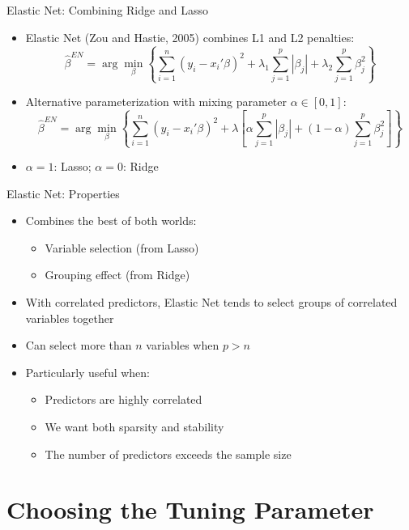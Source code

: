 \documentclass[aspectratio=169]{beamer}
\begin{document}
\begin{frame}{Elastic Net: Combining Ridge and Lasso}
\begin{itemize}
    \item Elastic Net (Zou and Hastie, 2005) combines L1 and L2 penalties:
    \[\hat{\beta}^{EN} = \arg\min_{\beta} \left\{ \sum_{i=1}^{n}(y_i - x_i'\beta)^2 + \lambda_1 \sum_{j=1}^{p}|\beta_j| + \lambda_2 \sum_{j=1}^{p}\beta_j^2 \right\}\]
    \item Alternative parameterization with mixing parameter $\alpha \in [0,1]$:
    \[\hat{\beta}^{EN} = \arg\min_{\beta} \left\{ \sum_{i=1}^{n}(y_i - x_i'\beta)^2 + \lambda \left[ \alpha \sum_{j=1}^{p}|\beta_j| + (1-\alpha) \sum_{j=1}^{p}\beta_j^2 \right] \right\}\]
    \item $\alpha = 1$: Lasso; $\alpha = 0$: Ridge
\end{itemize}
\end{frame}

\begin{frame}{Elastic Net: Properties}
\begin{itemize}
    \item Combines the best of both worlds:
    \begin{itemize}
        \item Variable selection (from Lasso)
        \item Grouping effect (from Ridge)
    \end{itemize}
    \item With correlated predictors, Elastic Net tends to select groups of correlated variables together
    \item Can select more than $n$ variables when $p > n$
    \item Particularly useful when:
    \begin{itemize}
        \item Predictors are highly correlated
        \item We want both sparsity and stability
        \item The number of predictors exceeds the sample size
    \end{itemize}
\end{itemize}
\end{frame}

\section{Choosing the Tuning Parameter}
\end{document}
